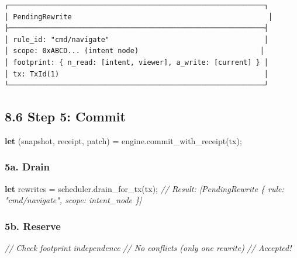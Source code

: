 \documentclass[
  11pt,
]{book}
\newenvironment{Shaded}{}{}
\newcommand{\CommentTok}[1]{\textcolor[rgb]{0.38,0.63,0.69}{\textit{#1}}}
\newcommand{\KeywordTok}[1]{\textcolor[rgb]{0.00,0.44,0.13}{\textbf{#1}}}
\newcommand{\NormalTok}[1]{#1}
\newcommand{\OperatorTok}[1]{\textcolor[rgb]{0.40,0.40,0.40}{#1}}
\begin{document}
\begin{verbatim}
┌─────────────────────────────────────────────────────────────┐
│ PendingRewrite                                               │
├─────────────────────────────────────────────────────────────┤
│ rule_id: "cmd/navigate"                                     │
│ scope: 0xABCD... (intent node)                             │
│ footprint: { n_read: [intent, viewer], a_write: [current] } │
│ tx: TxId(1)                                                 │
└─────────────────────────────────────────────────────────────┘
\end{verbatim}

\subsection{8.6 Step 5: Commit}\label{step-5-commit}

\begin{Shaded}
\begin{Highlighting}[]
\KeywordTok{let}\NormalTok{ (snapshot}\OperatorTok{,}\NormalTok{ receipt}\OperatorTok{,}\NormalTok{ patch) }\OperatorTok{=}\NormalTok{ engine}\OperatorTok{.}\NormalTok{commit\_with\_receipt(tx)}\OperatorTok{;}
\end{Highlighting}
\end{Shaded}

\subsubsection{5a. Drain}\label{a.-drain}

\begin{Shaded}
\begin{Highlighting}[]
\KeywordTok{let}\NormalTok{ rewrites }\OperatorTok{=}\NormalTok{ scheduler}\OperatorTok{.}\NormalTok{drain\_for\_tx(tx)}\OperatorTok{;}
\CommentTok{// Result: [PendingRewrite \{ rule: "cmd/navigate", scope: intent\_node \}]}
\end{Highlighting}
\end{Shaded}

\subsubsection{5b. Reserve}\label{b.-reserve}

\begin{Shaded}
\begin{Highlighting}[]
\CommentTok{// Check footprint independence}
\CommentTok{// No conflicts (only one rewrite)}
\CommentTok{// Accepted!}
\end{Highlighting}
\end{Shaded}
\end{document}
